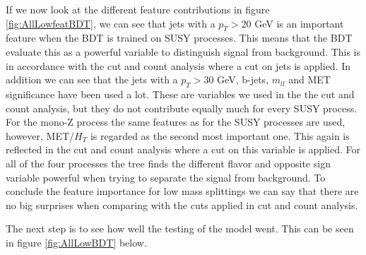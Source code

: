 If we now look at the different feature contributions in figure \ref{fig:AllLowfeatBDT}, we can see that jets with a $p_T > 20$ GeV is an important feature when the BDT is trained on SUSY processes. This means that the BDT evaluate this as a powerful variable to distinguish signal from background. This is in accordance with the cut and count analysis where a cut on jets is applied. In addition we can see that the jets with a $p_T > 30$ GeV, b-jets, $m_{ll}$ and MET significance have been used a lot. These are variables we used in the the cut and count analysis, but they do not contribute equally much for every SUSY process. For the mono-Z process the same features as for the SUSY processes are used, however, MET/$H_T$ is regarded as the second most important one. This again is reflected in the cut and count analysis where a cut on this variable is applied. For all of the four processes the tree finds the different flavor and opposite sign variable powerful when trying to separate the signal from background. To conclude the feature importance for low mass splittings we can say that there are no big surprises when comparing with the cuts applied in cut and count analysis.

The next step is to see how well the testing of the model went. This can be seen in figure \ref{fig:AllLowBDT} below.


